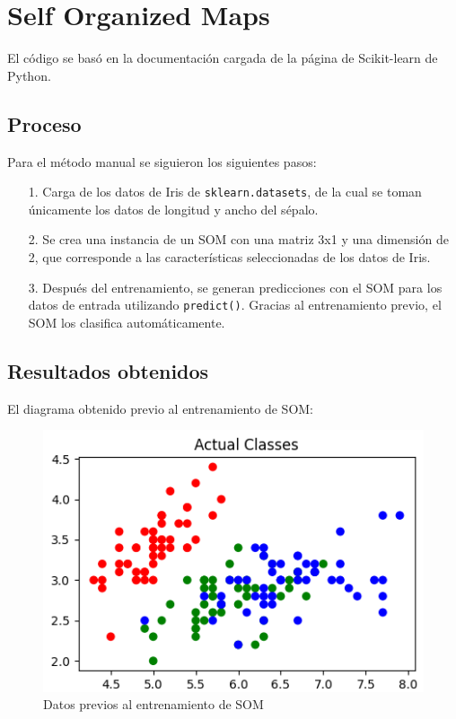 \section[SOM]{Self Organized Maps}
El código se basó en la documentación cargada de la página de Scikit-learn de Python.

\subsection[Proceso]{Proceso}
Para el método manual se siguieron los siguientes pasos:
\begin{itemize}
    \item[1.] Carga de los datos de Iris de \texttt{sklearn.datasets}, de la cual se toman únicamente los datos de longitud y ancho del sépalo.
    \item[2.] Se crea una instancia de un SOM con una matriz 3x1 y una dimensión de 2, que corresponde a las características seleccionadas de los datos de Iris.
    \item[3.] Después del entrenamiento, se generan predicciones con el SOM para los datos de entrada utilizando \texttt{predict()}. Gracias al entrenamiento previo, el SOM los clasifica automáticamente.
\end{itemize}

\subsection[Resultados]{Resultados obtenidos}

El diagrama obtenido previo al entrenamiento de SOM:

\begin{center}
    \begin{figure}[!ht]
        \centering
        \includegraphics[scale=0.67]{Previo_SOM.png}
        \caption{Datos previos al entrenamiento de SOM}
    \end{figure}
\end{center}

